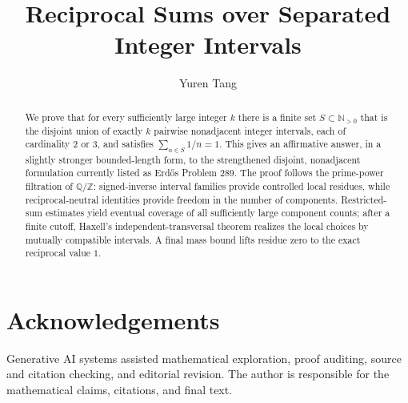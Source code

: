 \documentclass[11pt,a4paper,reqno]{amsart}
\title[Reciprocal Sums over Separated Intervals]{Reciprocal Sums over Separated Integer Intervals}
\author{Yuren Tang}
\date{}
\theoremstyle{definition}
\theoremstyle{remark}
\newcommand{\N}{\mathbb N}
\newcommand{\Q}{\mathbb Q}
\newcommand{\Z}{\mathbb Z}
\numberwithin{equation}{section}
\begin{document}
\begin{abstract}
We prove that for every sufficiently large integer $k$ there is a finite set $S\subset\N_{>0}$ that is the disjoint union of exactly $k$ pairwise nonadjacent integer intervals, each of cardinality $2$ or $3$, and satisfies $\sum_{n\in S}1/n=1$.  This gives an affirmative answer, in a slightly stronger bounded-length form, to the strengthened disjoint, nonadjacent formulation currently listed as Erd\H{o}s Problem 289.  The proof follows the prime-power filtration of $\Q/\Z$: signed-inverse interval families provide controlled local residues, while reciprocal-neutral identities provide freedom in the number of components.  Restricted-sum estimates yield eventual coverage of all sufficiently large component counts; after a finite cutoff, Haxell's independent-transversal theorem realizes the local choices by mutually compatible intervals.  A final mass bound lifts residue zero to the exact reciprocal value $1$.
\end{abstract}

\maketitle











\appendix




\section*{Acknowledgements}
Generative AI systems assisted mathematical exploration, proof auditing, source and citation checking, and editorial revision. The author is responsible for the mathematical claims, citations, and final text.

\clearpage
\printbibliography
\end{document}
